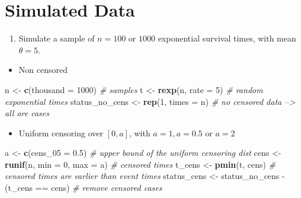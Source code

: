 \documentclass[]{book}
\newenvironment{Shaded}{\begin{snugshade}}{\end{snugshade}}
\newcommand{\KeywordTok}[1]{\textcolor[rgb]{0.13,0.29,0.53}{\textbf{{#1}}}}
\newcommand{\DataTypeTok}[1]{\textcolor[rgb]{0.13,0.29,0.53}{{#1}}}
\newcommand{\DecValTok}[1]{\textcolor[rgb]{0.00,0.00,0.81}{{#1}}}
\newcommand{\FloatTok}[1]{\textcolor[rgb]{0.00,0.00,0.81}{{#1}}}
\newcommand{\StringTok}[1]{\textcolor[rgb]{0.31,0.60,0.02}{{#1}}}
\newcommand{\CommentTok}[1]{\textcolor[rgb]{0.56,0.35,0.01}{\textit{{#1}}}}
\newcommand{\NormalTok}[1]{{#1}}
\providecommand{\tightlist}{%
  \setlength{\itemsep}{0pt}\setlength{\parskip}{0pt}}
\theoremstyle{definition}
\theoremstyle{definition}
\theoremstyle{definition}
\theoremstyle{remark}
\begin{document}
\section{Simulated Data}\label{simulated-data}

\begin{enumerate}
\def\labelenumi{\arabic{enumi}.}
\tightlist
\item
  Simulate a sample of \(n = 100\) or \(1000\) exponential survival
  times, with mean \(\theta = 5\).
\end{enumerate}

\begin{itemize}
\tightlist
\item
  Non censored
\end{itemize}

\begin{Shaded}
\begin{Highlighting}[]
\NormalTok{n              <-}\StringTok{ }\KeywordTok{c}\NormalTok{(}\DataTypeTok{thousand =} \DecValTok{1000}\NormalTok{)                                   }\CommentTok{# samples}
\NormalTok{t              <-}\StringTok{ }\KeywordTok{rexp}\NormalTok{(n, }\DataTypeTok{rate =} \DecValTok{5}\NormalTok{)                   }\CommentTok{# random exponential times}
\NormalTok{status_no_cens <-}\StringTok{ }\KeywordTok{rep}\NormalTok{(}\DecValTok{1}\NormalTok{, }\DataTypeTok{times =} \NormalTok{n)         }\CommentTok{# no censored data --> all are cases}
\end{Highlighting}
\end{Shaded}

\begin{itemize}
\tightlist
\item
  Uniform censoring over \([0, a]\), with \(a = 1, a = 0.5\) or
  \(a = 2\)
\end{itemize}

\begin{Shaded}
\begin{Highlighting}[]
\NormalTok{a              <-}\StringTok{ }\KeywordTok{c}\NormalTok{(}\DataTypeTok{cens_05 =} \FloatTok{0.5}\NormalTok{)   }\CommentTok{# upper bound of the uniform censoring dist}
\NormalTok{cens           <-}\StringTok{ }\KeywordTok{runif}\NormalTok{(n, }\DataTypeTok{min =} \DecValTok{0}\NormalTok{, }\DataTypeTok{max =} \NormalTok{a)                    }\CommentTok{# censored times}
\NormalTok{t_cens         <-}\StringTok{ }\KeywordTok{pmin}\NormalTok{(t, cens)    }\CommentTok{# censored times are earlier than event times}
\NormalTok{status_cens    <-}\StringTok{ }\NormalTok{status_no_cens -}\StringTok{ }\NormalTok{(t_cens ==}\StringTok{ }\NormalTok{cens)      }\CommentTok{# remove censored cases}
\end{Highlighting}
\end{Shaded}
\end{document}

